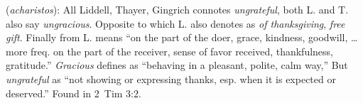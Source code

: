\item[Ungrateful,]

(\textit{acharistos}):
All Liddell, Thayer, Gingrich connotes \emph{ungrateful}, both L. and T. also say \emph{ungracious}. Opposite to  which L. also denotes as \emph{of thanksgiving}, \emph{free gift}. Finally  from L. means ``on the part of the doer, grace, kindness, goodwill, \ldots more freq. on the part of the receiver, sense of favor received, thankfulness, gratitude.'' \emph{Gracious} defines as ``behaving in a pleasant, polite, calm way,'' But \emph{ungrateful} as ``not showing or expressing thanks, esp. when it is expected or deserved.''
Found in 2~Tim 3:2.
